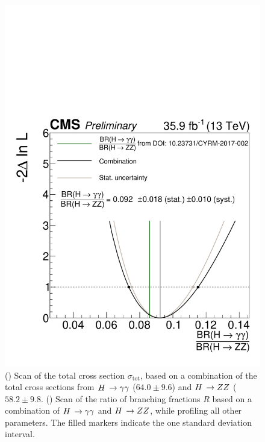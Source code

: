 \begin{figure}[hbtp]
\begin{center}
    \includegraphics[width=\cmsFigWidth]{img/resultsapproval/reworked/scans_ratioOfBRs.pdf}
    \caption{
        (\cmsLeft) Scan of the total cross section $\sigma_\text{tot}$, based on a combination of the total cross sections from $H\,\to\gamma\gamma$ ($64.0\pm9.6$\pb) and $H\,\to ZZ$ ($58.2\pm9.8$\pb.
        (\cmsRight) Scan of the ratio of branching fractions $R$ based on a combination of $H\,\to\gamma\gamma$ and $H\,\to ZZ$, while profiling all other parameters.
        The filled markers indicate the one standard deviation interval.
        }
    \label{fig:RatioOfbrsAndTotalXSscan}
  \end{center}
\end{figure}


